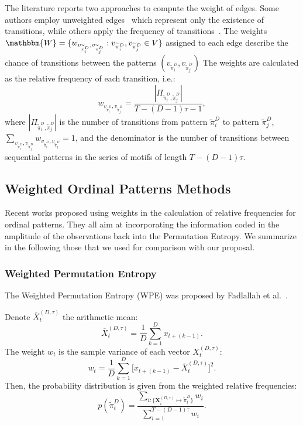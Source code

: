 \documentclass[journal]{IEEEtran}
\begin{document}
	The literature reports two approaches to compute the weight of edges.
	Some authors employ unweighted edges~\cite{McCullough2015lagged,Kulp2016ordinal} which represent only the existence of transitions, while others apply the frequency of transitions~\cite{Sorrentino2015periodic,Zhang2017ConstructingOP}.
	The weights $\mathbbm{W} = \{w_{v_{\widetilde{\pi}^D_i}, v_{\widetilde\pi^D_j}}: v_{\widetilde\pi^D_i}, v_{\widetilde\pi^D_j} \in V \}$ assigned to each edge describe the chance of transitions between the patterns $(v_{\widetilde\pi^D_i}, v_{\widetilde\pi^D_j})$
	The weights are calculated as the relative frequency of each transition, i.e.:
	\begin{equation}
	w_{v_{\widetilde\pi^D_i}, v_{\widetilde\pi^D_j}} = \frac{|\Pi_{\widetilde\pi^D_i,\widetilde\pi^D_j}|}{T-(D-1)\tau-1},
	\end{equation}
	where $|\Pi_{\widetilde\pi^D_i,\widetilde\pi^D_j}|$ is the number of transitions from pattern $\widetilde\pi^D_i$ to pattern $\widetilde\pi^D_j$, $\sum_{v_{\widetilde\pi^D_i}, v_{\widetilde\pi^D_j}}w_{v_{\widetilde\pi^D_i}, v_{\widetilde\pi^D_j}} = 1$,
	and the denominator is the number of transitions between sequential patterns in the series of motifs of length $T-(D-1)\tau$.
	
	\subsection{Weighted Ordinal Patterns Methods}\label{Methods}
	
	Recent works proposed using weights in the calculation of relative frequencies for ordinal patterns.
	They all aim at incorporating the information coded in the amplitude of the observations back into the Permutation Entropy.
	We summarize in the following those that we used for comparison with our proposal.
	
	\subsubsection{Weighted Permutation Entropy}\label{WPE}
	
	The Weighted Permutation Entropy (WPE) was proposed by Fadlallah et al.~\cite{Fadlallah2013Weightedpermutation}. 
	
	Denote $\overline{X}_t^{(D, \tau)}$ the arithmetic mean:
	\begin{equation}
	\overline{X}_t^{(D, \tau)} = \frac{1}{D} \sum_{k = 1}^{D} x_{t + (k - 1)}.
	\end{equation}
	The weight $w_{t}$ is the sample variance of each vector $X_t^{(D, \tau)}$:
	\begin{equation}
	w_{t} = \frac{1}{D} \sum_{k = 1}^{D}\big[x_{t + (k - 1)} - \overline{X}_t^{(D, \tau)}\big]^2 .
	\end{equation}
	Then, the probability distribution is given from the weighted relative frequencies:
	\begin{equation}
	p(\widetilde \pi_t^D) = \frac{\sum_{i : \{\mathbf{X}^{(D,\tau)}_i \mapsto \widetilde\pi^D_t\}} w_{i}}{\sum_{i = 1}^{T-(D-1)\tau} w_{i}}.
	\end{equation}
	
\end{document}
